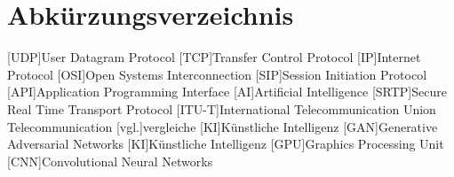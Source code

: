 \documentclass[12pt,a4paper]{article}
\begin{document}
\newpage
\tableofcontents

\newpage
\pagestyle{fancy}
\section*{Abkürzungsverzeichnis}
\begin{acronym}
	[UDP]{User Datagram Protocol}
	[TCP]{Transfer Control Protocol}
	[IP]{Internet Protocol}
	[OSI]{Open Systems Interconnection}
	[SIP]{Session Initiation Protocol}
	[API]{Application Programming Interface}
	[AI]{Artificial Intelligence}
	[SRTP]{Secure Real Time Transport Protocol}
	[ITU-T]{International Telecommunication Union Telecommunication}
	[vgl.]{vergleiche}
	[KI]{Künstliche Intelligenz}
	[GAN]{Generative Adversarial Networks}
	[KI]{Künstliche Intelligenz}
	[GPU]{Graphics Processing Unit}
	[CNN]{Convolutional Neural Networks}
\end{acronym}

\newpage
\listoffigures
\vspace*{\fill}

\newpage
{}
\acresetall

%
%
%
\end{document}
